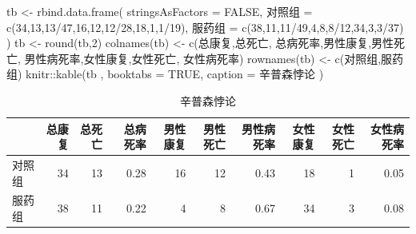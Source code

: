 \documentclass[]{tufte-book}
\newenvironment{Shaded}{}{}
\newcommand{\AttributeTok}[1]{\textcolor[rgb]{0.49,0.56,0.16}{#1}}
\newcommand{\ConstantTok}[1]{\textcolor[rgb]{0.53,0.00,0.00}{#1}}
\newcommand{\DecValTok}[1]{\textcolor[rgb]{0.25,0.63,0.44}{#1}}
\newcommand{\FunctionTok}[1]{\textcolor[rgb]{0.02,0.16,0.49}{#1}}
\newcommand{\NormalTok}[1]{#1}
\newcommand{\OtherTok}[1]{\textcolor[rgb]{0.00,0.44,0.13}{#1}}
\newcommand{\SpecialCharTok}[1]{\textcolor[rgb]{0.25,0.44,0.63}{#1}}
\newcommand{\StringTok}[1]{\textcolor[rgb]{0.25,0.44,0.63}{#1}}
\begin{document}
\begin{Shaded}
\begin{Highlighting}[]
\NormalTok{tb }\OtherTok{\textless{}{-}} \FunctionTok{rbind.data.frame}\NormalTok{(}
        \AttributeTok{stringsAsFactors =} \ConstantTok{FALSE}\NormalTok{,}
\NormalTok{        对照组 }\OtherTok{=} \FunctionTok{c}\NormalTok{(}\DecValTok{34}\NormalTok{,}\DecValTok{13}\NormalTok{,}\DecValTok{13}\SpecialCharTok{/}\DecValTok{47}\NormalTok{,}\DecValTok{16}\NormalTok{,}\DecValTok{12}\NormalTok{,}\DecValTok{12}\SpecialCharTok{/}\DecValTok{28}\NormalTok{,}\DecValTok{18}\NormalTok{,}\DecValTok{1}\NormalTok{,}\DecValTok{1}\SpecialCharTok{/}\DecValTok{19}\NormalTok{),}
\NormalTok{        服药组 }\OtherTok{=} \FunctionTok{c}\NormalTok{(}\DecValTok{38}\NormalTok{,}\DecValTok{11}\NormalTok{,}\DecValTok{11}\SpecialCharTok{/}\DecValTok{49}\NormalTok{,}\DecValTok{4}\NormalTok{,}\DecValTok{8}\NormalTok{,}\DecValTok{8}\SpecialCharTok{/}\DecValTok{12}\NormalTok{,}\DecValTok{34}\NormalTok{,}\DecValTok{3}\NormalTok{,}\DecValTok{3}\SpecialCharTok{/}\DecValTok{37}\NormalTok{)}
\NormalTok{        )}
\NormalTok{tb }\OtherTok{\textless{}{-}} \FunctionTok{round}\NormalTok{(tb,}\DecValTok{2}\NormalTok{)}
\FunctionTok{colnames}\NormalTok{(tb) }\OtherTok{\textless{}{-}} \FunctionTok{c}\NormalTok{(}\StringTok{\textquotesingle{}总康复\textquotesingle{}}\NormalTok{,}\StringTok{\textquotesingle{}总死亡\textquotesingle{}}\NormalTok{, }\StringTok{\textquotesingle{}总病死率\textquotesingle{}}\NormalTok{,}\StringTok{\textquotesingle{}男性康复\textquotesingle{}}\NormalTok{,}\StringTok{\textquotesingle{}男性死亡\textquotesingle{}}\NormalTok{, }\StringTok{\textquotesingle{}男性病死率\textquotesingle{}}\NormalTok{,}\StringTok{\textquotesingle{}女性康复\textquotesingle{}}\NormalTok{,}\StringTok{\textquotesingle{}女性死亡\textquotesingle{}}\NormalTok{, }\StringTok{\textquotesingle{}女性病死率\textquotesingle{}}\NormalTok{)}
\FunctionTok{rownames}\NormalTok{(tb) }\OtherTok{\textless{}{-}} \FunctionTok{c}\NormalTok{(}\StringTok{\textquotesingle{}对照组\textquotesingle{}}\NormalTok{,}\StringTok{\textquotesingle{}服药组\textquotesingle{}}\NormalTok{)}
\NormalTok{knitr}\SpecialCharTok{::}\FunctionTok{kable}\NormalTok{(tb}
\NormalTok{             , }\AttributeTok{booktabs =} \ConstantTok{TRUE}\NormalTok{,}
             \AttributeTok{caption =} \StringTok{\textquotesingle{}辛普森悖论\textquotesingle{}}
\NormalTok{)}
\end{Highlighting}
\end{Shaded}

\begin{table}

\caption{\label{tab:unnamed-chunk-15}辛普森悖论}
\centering
\begin{tabular}[t]{lrrrrrrrrr}
\toprule
  & 总康复 & 总死亡 & 总病死率 & 男性康复 & 男性死亡 & 男性病死率 & 女性康复 & 女性死亡 & 女性病死率\\
\midrule
对照组 & 34 & 13 & 0.28 & 16 & 12 & 0.43 & 18 & 1 & 0.05\\
服药组 & 38 & 11 & 0.22 & 4 & 8 & 0.67 & 34 & 3 & 0.08\\
\bottomrule
\end{tabular}
\end{table}
\end{document}
